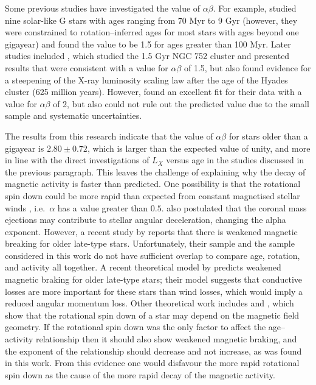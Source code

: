 Some previous studies have investigated the value of $\alpha\beta$. For example, \citet{Gudel_etal_1997} studied nine solar-like G stars with ages ranging from 70 Myr to 9 Gyr (however, they were constrained to rotation--inferred ages for most stars with ages beyond one gigayear) and found the value to be 1.5 for ages greater than 100 Myr. Later studies included \citealp{Giardino_etal_2008}, which studied the 1.5 Gyr NGC 752 cluster and presented results that were consistent with a value for $\alpha\beta$ of 1.5, but also found evidence for a steepening of the X-ray luminosity scaling law after the age of the Hyades cluster (625 million years). However, \citet{Feigelson_etal_2004} found an excellent fit for their data with a value for $\alpha\beta$ of 2, but also could not rule out the predicted value due to the small sample and systematic uncertainties.

The results from this research indicate that the value of $\alpha\beta$ for stars older than a gigayear is $2.80 \pm 0.72$, which is larger than the expected value of unity, and more in line with the direct investigations of $L_X$ versus age in the studies discussed in the previous paragraph. This leaves the challenge of explaining why the decay of magnetic activity is faster than predicted. One possibility is that the rotational spin down could be more rapid than expected from constant magnetised stellar winds \citep{Kawaler_1988}, i.e.\ $\alpha$ has a value greater than $0.5$. \citet{Feigelson_etal_2004} also postulated that the coronal mass ejections may contribute to stellar angular deceleration, changing the alpha exponent. However, a recent study by \citet{van_Saders_etal_2016} reports that there is weakened magnetic breaking for older late-type stars. Unfortunately, their sample and the sample considered in this work do not have sufficient overlap to compare age, rotation, and activity all together. A recent theoretical model by \citet{Blackman_Owen_2016} predicts weakened magnetic braking for older late-type stars; their model suggests that conductive losses are more important for these stars than wind losses, which would imply a reduced angular momentum loss. Other theoretical work includes \citet{Garraffo_etal_2015} and \citet{Vidotto_etal_2016}, which show that the rotational spin down of a star may depend on the magnetic field geometry. If the rotational spin down was the only factor to affect the age--activity relationship then it should also show weakened magnetic braking, and the exponent of the relationship should decrease and not increase, as was found in this work. From this evidence one would disfavour the more rapid rotational spin down as the cause of the more rapid decay of the magnetic activity.

